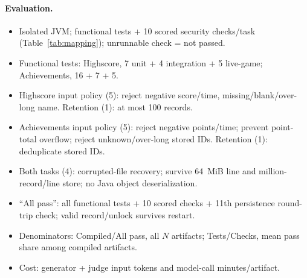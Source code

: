 \paragraph{Evaluation.}
\begin{itemize}
\item Isolated JVM; functional tests + 10 scored security checks/task
(Table~\ref{tab:mapping}); unrunnable check = not passed.
\item Functional tests: Highscore, 7 unit + 4 integration + 5 live-game;
Achievements, 16 + 7 + 5.
\item Highscore input policy (5): reject negative score/time,
missing/blank/over-long name. Retention (1): at most 100 records.
\item Achievements input policy (5): reject negative points/time;
prevent point-total overflow; reject unknown/over-long stored IDs.
Retention (1): deduplicate stored IDs.
\item Both tasks (4): corrupted-file recovery; survive 64~MiB line
and million-record/line store; no Java object deserialization.
\item ``All pass'': all functional tests + 10 scored checks + 11th
persistence round-trip check; valid record/unlock survives restart.
\item Denominators: Compiled/All pass, all $N$ artifacts;
Tests/Checks, mean pass share among compiled artifacts.
\item Cost: generator + judge input tokens and model-call minutes/artifact.
\end{itemize}
